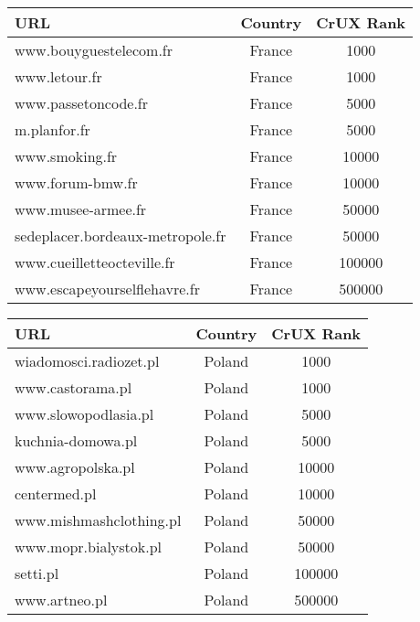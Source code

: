 \begin{center}
\begin{tabular}{lcc}
	\toprule
	URL                      & Country & CrUX Rank \\
	\midrule
    www.bouyguestelecom.fr   & France  & 1000 \\
    www.letour.fr            & France  & 1000 \\
    www.passetoncode.fr      & France  & 5000 \\
    m.planfor.fr             & France  & 5000 \\
    www.smoking.fr           & France  & 10000 \\
    www.forum-bmw.fr         & France  & 10000 \\
    www.musee-armee.fr       & France  & 50000 \\
    sedeplacer.bordeaux-metropole.fr & France  & 50000 \\
    www.cueilletteocteville.fr & France  & 100000 \\
    www.escapeyourselflehavre.fr & France  & 500000 \\
	\bottomrule
\end{tabular}
\end{center}

\begin{center}
\begin{tabular}{lcc}
	\toprule
	URL                      & Country & CrUX Rank \\
	\midrule
    wiadomosci.radiozet.pl   & Poland  & 1000 \\
    www.castorama.pl         & Poland  & 1000 \\
    www.slowopodlasia.pl     & Poland  & 5000 \\
    kuchnia-domowa.pl        & Poland  & 5000 \\
    www.agropolska.pl        & Poland  & 10000 \\
    centermed.pl             & Poland  & 10000 \\
    www.mishmashclothing.pl  & Poland  & 50000 \\
    www.mopr.bialystok.pl    & Poland  & 50000 \\
    setti.pl                 & Poland  & 100000 \\
    www.artneo.pl            & Poland  & 500000 \\
    \bottomrule
\end{tabular}
\end{center}

